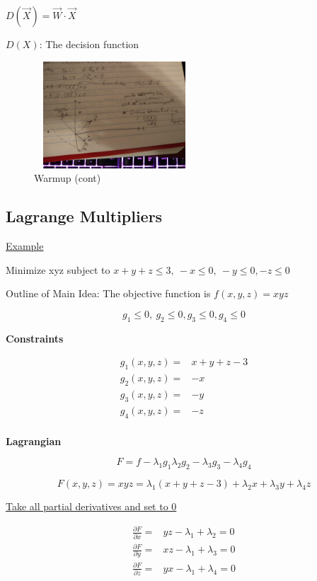 \documentclass[11pt]{article}
\begin{document}
\(D(\vec X) = \vec W \cdot \vec X\)

\(D(X)\): The decision function

\begin{figure}[htbp]
\centering
\includegraphics[width=6cm,height=4cm]{./resources/warmup2.jpg}
\caption{\label{fig:org779c800}Warmup (cont)}
\end{figure}

\subsection{Lagrange Multipliers}
\label{sec:orgf8a7d78}

\uline{Example}

Minimize xyz subject to \(x + y + z \leq 3, \ -x \leq 0, \ -y \leq 0, -z \leq 0\)

Outline of Main Idea: The objective function is \(f(x, y, z) = xyz\)

$$
g_1 \leq 0, \ g_2 \leq 0, g_3 \leq 0, g_4 \leq 0
$$

\textbf{Constraints}

\begin{equation}
\begin{split}
g_1 (x, y, z) = & x + y + z - 3\\
g_2 (x, y, z) = & -x\\
g_3 (x, y, z) = & -y\\
g_4 (x, y, z) = & -z\\
\end{split}
\end{equation}

\textbf{Lagrangian}

$$
F = f - \lambda_1 g_1 \lambda_2 g_2 - \lambda_3 g_3 - \lambda_4 g_4
$$

$$
F(x,y,z) = xyz = \lambda_1 (x + y + z - 3) + \lambda_2 x + \lambda_3 y +
\lambda_4 z
$$

\uline{Take all partial derivatives and set to 0}

\begin{equation}
\begin{split}
\frac{\partial F}{\partial x} = & yz - \lambda_1 + \lambda_2 = 0\\
\frac{\partial F}{\partial y} = & xz - \lambda_1 + \lambda_3 = 0\\
\frac{\partial F}{\partial z} = & yx - \lambda_1 + \lambda_4 = 0\\
\end{split}
\end{equation}
\end{document}
